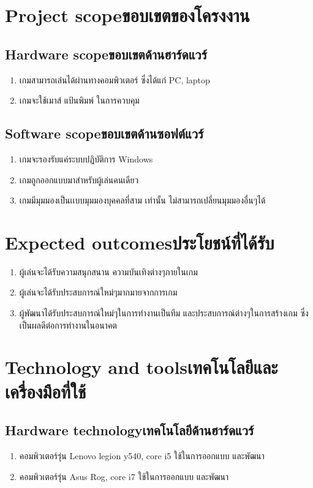 \section{\ifenglish Project scope\else ขอบเขตของโครงงาน\fi}

\subsection{\ifenglish Hardware scope\else ขอบเขตด้านฮาร์ดแวร์\fi}
\begin{enumerate}
    \item เกมสามารถเล่นได้ผ่านทางคอมพิวเตอร์ ซึ่งได้แก่ PC, laptop
    \item เกมจะใช้เมาส์ แป้นพิมพ์ ในการควบคุม
\end{enumerate}
\subsection{\ifenglish Software scope\else ขอบเขตด้านซอฟต์แวร์\fi}
\begin{enumerate}
    \item เกมจะรองรับแค่ระบบปฏิบัติการ Windows
    \item เกมถูกออกแบบมาสำหรับผู้เล่นคนเดียว
    \item เกมมีมุมมองเป็นเเบบมุมมองบุคคลที่สาม เท่านั้น ไม่สามารถเปลี่ยนมุมมองอื่นๆได้
\end{enumerate}
\section{\ifenglish Expected outcomes\else ประโยชน์ที่ได้รับ\fi}
\begin{enumerate}
    \item ผู้เล่นจะได้รับความสนุกสนาน ความบันเทิงต่างๆภายในเกม
    \item ผู้เล่นจะได้รับประสบการณ์ใหม่ๆมากมายจากการเกม
    \item ผู้พัฒนาได้รับประสบการณ์ใหม่ๆในการทำงานเป็นทีม และประสบการณ์ต่างๆในการสร้างเกม ซึ่งเป็นผลดีต่อการทำงานในอนาคต
\end{enumerate}
\section{\ifenglish Technology and tools\else เทคโนโลยีและเครื่องมือที่ใช้\fi}

\subsection{\ifenglish Hardware technology\else เทคโนโลยีด้านฮาร์ดแวร์\fi}
\begin{enumerate}
    \item คอมพิวเตอร์รุ่น Lenovo legion y540, core i5  ใช้ในการออกแบบ และพัฒนา
    \item คอมพิวเตอร์รุ่น Asus Rog, core i7 ใช้ในการออกแบบ และพัฒนา
\end{enumerate}
